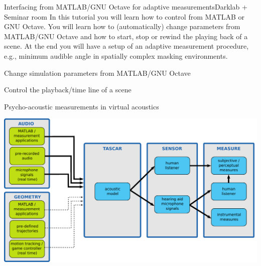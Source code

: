\documentclass[11pt,a4paper,twoside]{article}
\begin{document}
\setcounter{tutorial}{1}
\begin{tutorial}{Interfacing from MATLAB/GNU Octave for adaptive measurements}{Darklab + Seminar room}
  In this tutorial you will learn how to control \tascar{} from MATLAB or GNU Octave. 
  You will learn how to (automatically) change \tascar{} parameters from MATLAB/GNU Octave and how to start, stop or rewind the playing back of a scene. 
  At the end you will have a setup of an adaptive measurement procedure, e.g., minimum audible angle in spatially complex masking environments.

  \begin{learnitems}
  \item Change simulation parameters from MATLAB/GNU Octave
  \item Control the playback/time line of a scene
  \end{learnitems}

  \begin{appitems}
  \item Psycho-acoustic measurements in virtual acoustics
  \end{appitems}

  \centerline{\includegraphics[width=0.8\columnwidth]{applications}}
\end{tutorial}

\ifshowtutorial

\newpage
\end{document}
